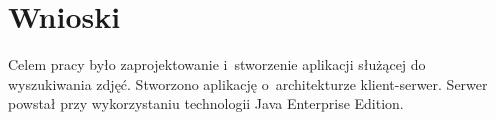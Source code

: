 \section{Wnioski}
Celem pracy było zaprojektowanie i~stworzenie aplikacji służącej do wyszukiwania zdjęć. Stworzono aplikację o~architekturze klient-serwer. Serwer powstał przy wykorzystaniu technologii Java Enterprise Edition.

